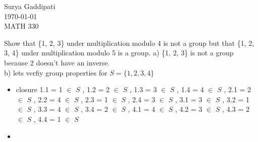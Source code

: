 \documentclass[12pt]{article}
\newenvironment{faq}{\begin{description}[style=nextline]}{\end{description}}
\begin{document}
 
Surya Gaddipati\\
\today \\
MATH 330 
\begin{faq}
\item[Show that \{1, 2, 3\} under multiplication modulo 4 is not a group but that \{1, 2, 3, 4\} under multiplication modulo 5 is a group.]
  a) \{1, 2, 3\}  is not a group because  $2$ doesn't have an inverse. \\
b) lets verfiy group properties for $S = \{1, 2, 3, 4\} $

 \begin{itemize}
   \item closure
     1.1 = 1 $\in$ $S$ , 
     1.2 = 2 $\in$ $S$ , 
     1.3 = 3 $\in$ $S$ , 
     1.4 = 4 $\in$ $S$ , 
     2.1 = 2 $\in$ $S$ , 
     2.2 = 4 $\in$ $S$ , 
     2.3 = 1 $\in$ $S$ , 
     2.4 = 3 $\in$ $S$ , 
     3.1 = 3 $\in$ $S$ , 
     3.2 = 1 $\in$ $S$ , 
     3.3 = 4 $\in$ $S$ , 
     3.4 = 2 $\in$ $S$ , 
     4.1 = 4 $\in$ $S$ , 
     4.2 = 3 $\in$ $S$ , 
     4.3 = 2 $\in$ $S$ , 
     4.4 = 1 $\in$ $S$  
   \item 
  \end{itemize}

\end{faq}
\end{document}
